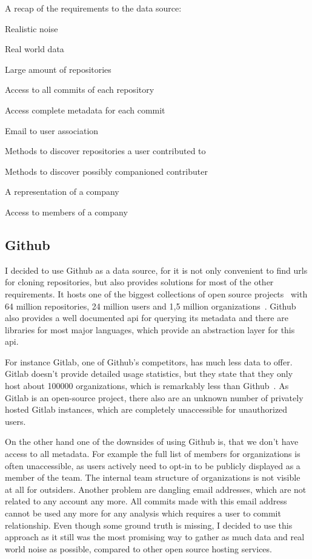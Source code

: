 \begin{itemlist}{A recap of the requirements to the data source:}
    \item Realistic noise
    \item Real world data
    \item Large amount of repositories
    \item Access to all commits of each repository
    \item Access complete metadata for each commit
    \item Email to user association
    \item Methods to discover repositories a user contributed to
    \item Methods to discover possibly companioned contributer
    \item A representation of a company
    \item Access to members of a company
\end{itemlist}


\subsection{Github}
I decided to use Github as a data source, for it is not only convenient to find \acp{url} for cloning repositories, but also provides solutions for most of the other requirements.
It hosts one of the biggest collections of open source projects~\cite{techreport:how-github-conquered} with 64 million repositories, 24 million users and 1,5 million organizations~\cite{article:github-statistics}.
Github also provides a well documented \ac{api} for querying its metadata and there are libraries for most major languages, which provide an abstraction layer for this \ac{api}.

For instance Gitlab, one of Github's competitors, has much less data to offer.
Gitlab doesn't provide detailed usage statistics, but they state that they only host about 100000 organizations, which is remarkably less than Github~\cite{article:gitlab-help}.
As Gitlab is an open-source project, there also are an unknown number of privately hosted Gitlab instances, which are completely unaccessible for unauthorized users.

On the other hand one of the downsides of using Github is, that we don't have access to all metadata.
For example the full list of members for organizations is often unaccessible, as users actively need to opt-in to be publicly displayed as a member of the team.
The internal team structure of organizations is not visible at all for outsiders.
Another problem are dangling email addresses, which are not related to any account any more.
All commits made with this email address cannot be used any more for any analysis which requires a user to commit relationship.
Even though some ground truth is missing, I decided to use this approach as it still was the most promising way to gather as much data and real world noise as possible, compared to other open source hosting services.

